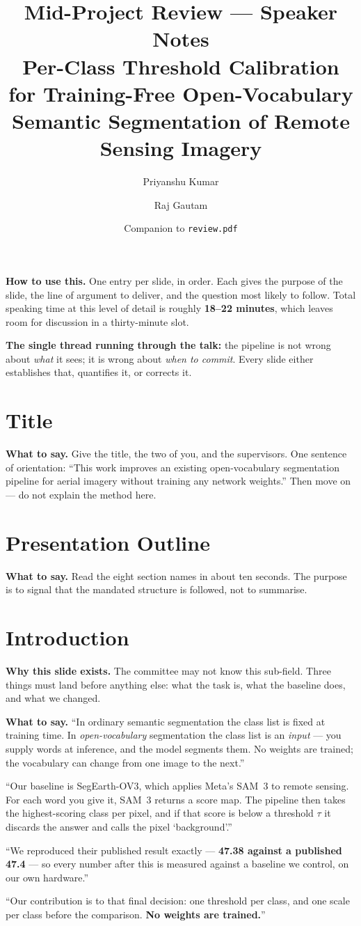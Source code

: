 \documentclass[11pt,a4paper]{article}
\title{\textbf{Mid-Project Review --- Speaker Notes}\\
\large Per-Class Threshold Calibration for Training-Free Open-Vocabulary\\
Semantic Segmentation of Remote Sensing Imagery}
\author{Priyanshu Kumar \and Raj Gautam}
\date{Companion to \texttt{review.pdf}}
\newcommand{\best}[1]{\textcolor{acc}{\textbf{#1}}}
\newcommand{\why}[1]{\par\smallskip\noindent\textbf{Why this slide exists.} #1}
\newcommand{\say}[1]{\par\smallskip\noindent\textbf{What to say.} #1}
\begin{document}
\maketitle

\noindent\textbf{How to use this.} One entry per slide, in order. Each gives the
purpose of the slide, the line of argument to deliver, and the question most
likely to follow. Total speaking time at this level of detail is roughly
\textbf{18--22 minutes}, which leaves room for discussion in a thirty-minute slot.

\medskip
\noindent\best{The single thread running through the talk:} the pipeline is not
wrong about \emph{what} it sees; it is wrong about \emph{when to commit}. Every
slide either establishes that, quantifies it, or corrects it.

\section{Title}
\say{Give the title, the two of you, and the supervisors. One sentence of
orientation: ``This work improves an existing open-vocabulary segmentation
pipeline for aerial imagery without training any network weights.'' Then move
on --- do not explain the method here.}

\section{Presentation Outline}
\say{Read the eight section names in about ten seconds. The purpose is to signal
that the mandated structure is followed, not to summarise.}

\section{Introduction}
\why{The committee may not know this sub-field. Three things must land before
anything else: what the task is, what the baseline does, and what we changed.}

\say{``In ordinary semantic segmentation the class list is fixed at training
time. In \emph{open-vocabulary} segmentation the class list is an \emph{input} ---
you supply words at inference, and the model segments them. No weights are
trained; the vocabulary can change from one image to the next.''

\smallskip
``Our baseline is SegEarth-OV3, which applies Meta's SAM~3 to remote sensing. For
each word you give it, SAM~3 returns a score map. The pipeline then takes the
highest-scoring class per pixel, and if that score is below a threshold $\tau$ it
discards the answer and calls the pixel `background'.''

\smallskip
``We reproduced their published result exactly --- \best{47.38 against a
published 47.4} --- so every number after this is measured against a baseline we
control, on our own hardware.''

\smallskip
``Our contribution is to that final decision: one threshold per class, and one
scale per class before the comparison. \best{No weights are trained.}''}
\end{document}
